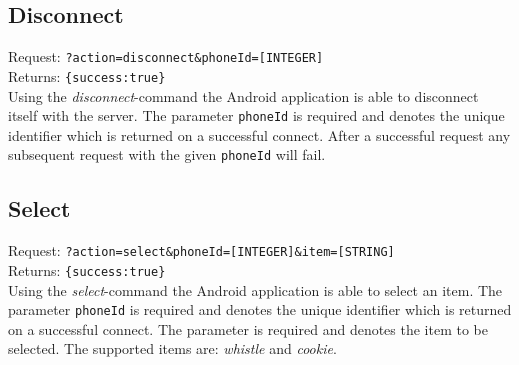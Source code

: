 \documentclass[a4paper,10pt]{article}
\begin{document}
\subsection{Disconnect}
Request: \texttt{?action=disconnect\&phoneId=[INTEGER]} \\
Returns: \texttt{\{success:true\}} \\

\noindent Using the \emph{disconnect}-command the Android application is able to disconnect itself with the server.
The parameter \texttt{phoneId} is required and denotes the unique identifier which is returned on a successful connect.
After a successful request any subsequent request with the given \texttt{phoneId} will fail.

\subsection{Select}
Request: \texttt{?action=select&phoneId=[INTEGER]&item=[STRING]} \\
Returns: \texttt{\{success:true\}} \\

\noindent Using the \emph{select}-command the Android application is able to select an item.
The parameter \texttt{phoneId} is required and denotes the unique identifier which is returned on a successful connect.
The parameter  is required and denotes the item to be selected. The supported items are: \emph{whistle} and \emph{cookie}.
\end{document}
